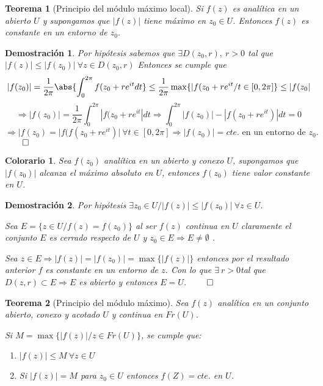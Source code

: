 \documentclass[10pt]{book}
\newtheorem{theorem}{Teorema}[chapter]
\newtheorem*{dem}{Demostración}
\newtheorem{col}{Colorario}[chapter]
\begin{document}
\begin{theorem}[Principio del módulo máximo local]
Si $f(z)$ es analítica en un abierto $U$ y supongamos que $|f(z)|$ tiene máximo en $z_0\in U$. Entonces $f(z)$ es constante en un entorno de $z_0$.
\end{theorem}

\begin{dem}
Por hipótesis sabemos que $\exists D(z_0,r),\ r>0$ tal que $|f(z)| \leq |f(z_0)|\ \forall z \in D(z_0,r)$ Entonces se cumple que
$$
|f(z_0)| = \frac{1}{2\pi}\abs{\int_0^{2\pi}f(z_0+re^{it}dt} \leq \frac{1}{2\pi}\max\{|f(z_0+re^{it}/t\in [0,2\pi]\}\leq |f(z_0|
$$
$$
\Rightarrow |f(z_0)| = \frac{1}{2\pi}\int_0^{2\pi}|f(z_0+re^{it}|dt \Rightarrow \int_0^{2\pi} |f(z_0)|-|f(z_0+re^{it})|dt = 0
$$
$$
\Rightarrow |f(z_0) = |f(f(z_0+re^{it})|\ \forall t\in[0,2\pi]\Rightarrow |f(z_0)|= cte. \text{ en un entorno de } z_0.
$$$\qed$
\end{dem}

\begin{col}
Sea $f(z_0)$ analítica en un abierto y conexo $U$, supongamos que $|f(z_0)|$ alcanza el máximo absoluto en $U$, entonces $f(z_0)$ tiene valor constante en $U$.
\end{col}
\begin{dem}
Por hipótesis $\exists z_0 \in U / |f(z)|\leq |f(z_0)| \ \forall z \in U$.

Sea $E = \{z\in U / f(z) = f(z_0)\}$ al ser $f(z)$ continua en $U$ claramente el conjunto $E$ es cerrado respecto de $U$  y $z_0\in E \Rightarrow E \neq \emptyset$ .

Sea $z\in E \Rightarrow |f(z)| = |f(z_0)| = \max\{|f(z)|\}$ entonces por el resultado anterior $f$ es constante en un entorno de $z$. Con lo que $\exists\  r>0 $tal que $D(z,r)\subset E \Rightarrow E$ es abierto y entonces $E=U$. $\qed$
\end{dem}

\begin{theorem}[Principio del módulo máximo]
Sea $f(z)$ analítica en un conjunto abierto, conexo y acotado $U$ y continua en $Fr(U)$. 

Si $M =\max \{|f(z)|/ z\in Fr(U)\}$, se cumple que:

\begin{enumerate}
\item $|f(z)|\leq M \ \forall z \in U$
\item Si $|f(z)| = M$ para $z_0 \in U$ entonces $f(Z) = cte.$ en $U$.
\end{enumerate}
\end{theorem}
\end{document}
